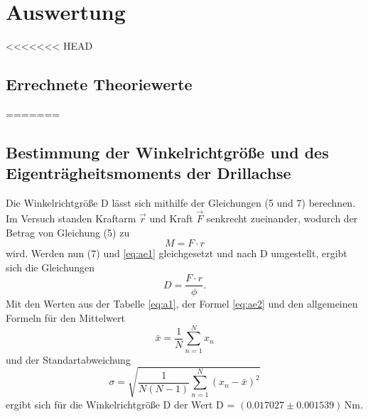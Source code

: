 \section{Auswertung}
\label{sec:Auswertung}

<<<<<<< HEAD
\subsection{Errechnete Theoriewerte}
=======

\subsection{Bestimmung der Winkelrichtgröße und des Eigenträgheitsmoments der Drillachse}

Die Winkelrichtgröße D lässt sich mithilfe der Gleichungen (5 und 7) berechnen. Im Versuch standen 
Kraftarm $\vec{r}$ und Kraft $\vec{F}$ senkrecht zueinander, wodurch der Betrag von Gleichung (5) 
zu
\begin{equation}
    M = F \cdot r
    \label{eq:ae1}
\end{equation}
\noindent
wird. Werden nun (7) und \ref{eq:ae1} gleichgesetzt und nach D umgestellt, ergibt sich die Gleichungen
\begin{equation}
    D = \frac{F\cdot r}{\phi}.
    \label{eq:ae2}
\end{equation}
\noindent
Mit den Werten aus der Tabelle \ref{eq:a1}, der Formel \ref{eq:ae2} und den allgemeinen Formeln für den Mittelwert
\begin{equation}
    \bar{x} = \frac{1}{N} \sum_{n=1}^N x_n 
    \label{eq:ae3}
\end{equation}
\noindent
und der Standartabweichung
\begin{equation}
    \sigma = \sqrt{\frac{1}{N(N-1)} \sum_{n=1}^N (x_n - \bar{x})^2}
\end{equation}
\noindent
ergibt sich für die Winkelrichtgröße D der Wert D = $(0.017027 \pm 0.001539)\,$Nm.


